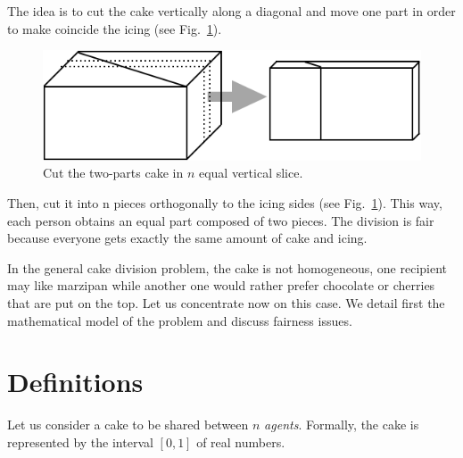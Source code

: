 \begin{itemize}
\begin{figure}[htb]
\begin{center}
\end{center}
\end{figure}
The idea is to cut the cake vertically along a diagonal and move one part in order to make coincide the icing
(see Fig.~\ref{Fig:cakeHomogeneous3}).
\begin{figure}[htb]
\begin{center}
        \includegraphics[scale=0.4]{FiguresMaths/CakeHomogeneous3}
        \caption{Cut the two-parts cake in $n$ equal vertical slice.}
        \label{Fig:cakeHomogeneous3}
\end{center}
\end{figure}
Then, cut it into n pieces orthogonally to the icing sides (see Fig.~\ref{Fig:cakeHomogeneous3}). 
This way, each person obtains an equal part composed of two pieces. 
The division is fair because everyone gets exactly the same amount of cake and icing. 
\end{itemize}

In the general cake division problem, the cake is not homogeneous, 
one recipient may like marzipan while another one would rather prefer chocolate or cherries
that are put on the top.
Let us concentrate now on this case.
We detail first the mathematical model of the problem and discuss fairness issues. 


\section{Definitions}

Let us consider a cake to be shared between $n$ \textit{agents}. 
Formally, the cake is represented by the interval $[0,1]$ of real numbers.

